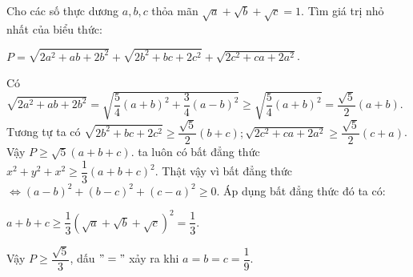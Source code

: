 \begin{ex}%
	Cho các số thực dương $a, b, c$ thỏa mãn $\sqrt{a}+\sqrt{b}+\sqrt{c}=1$. Tìm giá trị nhỏ nhất của biểu thức:
	\begin{center}
	$P=\sqrt{2a^2+ab+2b^2}+\sqrt{2b^2+bc+2c^2}+\sqrt{2c^2+ca+2a^2}$.
	\end{center}
	\loigiai
	{Có $\sqrt{2a^2+ab+2b^2}=\sqrt{\dfrac{5}{4}(a+b)^2+\dfrac{3}{4}(a-b)^2}\geq \sqrt{\dfrac{5}{4}(a+b)^2}=\dfrac{\sqrt{5}}{2}(a+b).$\\
		Tương tự ta có $\sqrt{2b^2+bc+2c^2}\geq \dfrac{\sqrt{5}}{2}(b+c);\sqrt{2c^2+ca+2a^2}\geq \dfrac{\sqrt{5}}{2}(c+a)$.\\
		Vậy $P\geq \sqrt{5}(a+b+c)$.
		ta luôn có bất đẳng thức $x^2+y^2+x^2\geq \dfrac{1}{3}(a+b+c)^2$. Thật vậy vì bất đẳng thức $\Leftrightarrow (a-b)^2+(b-c)^2+(c-a)^2\geq 0$. Áp dụng bất đẳng thức đó ta có:
		\begin{center}
		$a+b+c\geq \dfrac{1}{3}\left( \sqrt{a}+\sqrt{b}+\sqrt{c}\right) ^2=\dfrac{1}{3}.$
	\end{center}
		Vậy $P\geq\dfrac{\sqrt{5}}{3}$, dấu $"="$ xảy ra khi $a=b=c=\dfrac{1}{9}$.
	} 
\end{ex}
